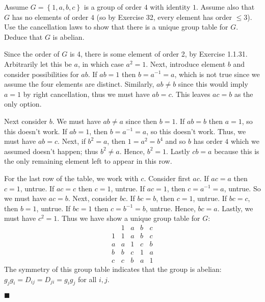 \documentclass[12pt]{article}
\renewcommand{\qed}{\hfill$\blacksquare$}
\renewenvironment{proof}{\begin{addmargin}[1em]{0em}\begin{newproof}}{\end{newproof}\end{addmargin}\qed}
\newenvironment{problem}[2][Exercise]{\begin{trivlist}
\item[\hskip \labelsep {\bfseries #1}\hskip \labelsep {\bfseries #2.}]}{\end{trivlist}}
\begin{document}
\begin{problem}{1.1.36}
Assume $G=\left\{1,a,b,c\right\}$ is a group of order $4$ with identity $1$. Assume also that $G$ has no elements of order $4$ (so by Exercise 32, every element has order $\leq 3$). Use the cancellation laws to show that there is a unique group table for $G$. Deduce that $G$ is abelian.
\end{problem}
\begin{proof}
Since the order of $G$ is 4, there is some element of order 2, by Exercise 1.1.31. Arbitrarily let this be $a$, in which case $a^2 = 1$. Next, introduce element $b$ and consider possibilities for $ab$. If $ab=1$ then $b=a^{-1}=a$, which is not true since we assume the four elements are distinct. Similarly, $ab\neq b$ since this would imply $a=1$ by right cancellation, thus we must have $ab=c$. This leaves $ac=b$ as the only option.

Next consider $b$. We must have $ab\neq a$ since then $b=1$. If $ab=b$ then $a=1$, so this doesn't work. If $ab=1$, then $b=a^{-1}=a$, so this doesn't work. Thus, we must have $ab=c$. Next, if $b^2=a$, then $1 = a^2 = b^4$ and so $b$ has order $4$ which we assumed doesn't happen; thus $b^2\neq a$. Hence, $b^2 = 1$. Lastly $cb=a$ because this is the only remaining element left to appear in this row.

For the last row of the table, we work with $c$. Consider first $ac$. If $ac=a$ then $c=1$, untrue. If $ac=c$ then $c=1$, untrue. If $ac=1$, then $c=a^{-1}=a$, untrue. So we must have $ac=b$. Next, consider $bc$. If $bc=b$, then $c=1$, untrue. If $bc=c$, then $b=1$, untrue. If $bc=1$ then $c=b^{-1}=b$, untrue. Hence, $bc=a$. Lastly, we must have $c^2=1$. Thus we have show a unique group table for $G$:
\begin{equation*}
    \begin{array}{c|cccc}
    & 1 & a & b & c \\ \hline
    1 & 1 & a & b & c \\
    a & a & 1 & c & b \\
    b & b & c & 1 & a \\
    c & c & b & a & 1
    \end{array}
\end{equation*}
The symmetry of this group table indicates that the group is abelian: $g_jg_i = D_{ij} = D_{ji}=g_ig_j$ for all $i,j$.
\end{proof}
\end{document}
